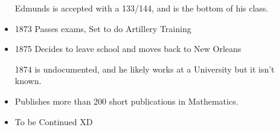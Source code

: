 \documentclass{report}
\begin{document}
\begin{description}
\begin{mdframed}
\begin{itemize}
\begin{mdframed}
                        Edmunds is accepted with a 133/144,
                        and is the bottom of his class.
                    \end{mdframed}
                \item 1873 Passes exams, Set to do Artillery
                    Training
                \item 1875 Decides to leave school and moves
                    back to New Orleans
                    \begin{mdframed}
                        1874 is undocumented, and he likely
                        works at a University but it isn't
                        known.
                    \end{mdframed}
                \item Publishes more than 200 short publications
                    in Mathematics.
                \item To be Continued XD
            \end{itemize}
        \end{mdframed}
\end{description}
\end{document}
